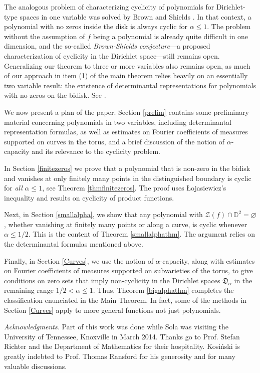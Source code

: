 \documentclass[11 pt,reqno]{amsart}
\theoremstyle{definition}
\theoremstyle{remark}
\numberwithin{equation}{section} \numberwithin{figure}{section}
\begin{document}
The analogous problem of characterizing cyclicity of polynomials for
Dirichlet-type spaces in one variable was solved by Brown and Shields
\cite{BS84}. In that context, a polynomial with no zeros inside the
disk is always cyclic for $\alpha \leq 1$. The problem without the
assumption of $f$ being a polynomial is already quite difficult in one
dimension, and the so-called \emph{Brown-Shields conjecture}---a
proposed characterization of cyclicity in the Dirichlet space---still
remains open.  Generalizing our theorem to three or more variables
also remains open, as much of our approach in item (1) of the main
theorem relies heavily on an essentially two variable result: the
existence of determinantal representations for polynomials with no
zeros on the bidisk.  See \cite{AM05, GKW, Kne09, VV, HW}.

We now present a plan of the paper. Section \ref{prelim} contains some
preliminary material concerning polynomials in two variables,
including determinantal representation formulas, as well as estimates
on Fourier coefficients of measures supported on curves in the torus,
and a brief discussion of the notion of $\alpha$-capacity and its
relevance to the cyclicity problem.

In Section \ref{finitezeros} we prove that a polynomial that is non-zero in the bidisk and
vanishes at only finitely many points in the distinguished boundary is cyclic for {\it all} $\alpha \leq 1$, see Theorem \ref{thmfinitezeros}. The
proof uses \L ojasiewicz's inequality and results on cyclicity of product functions.

Next, in Section \ref{smallalpha}, we show that any polynomial with
$\mathcal{Z}(f)\cap {{\mathbb D}}^2=\varnothing$, whether vanishing at finitely
many points or along a curve, is cyclic whenever $\alpha \leq
1/2$. This is the content of Theorem \ref{smallalphathm}.  The
argument relies on the determinantal formulas mentioned above.

Finally, in Section \ref{Curves}, we use the notion of
$\alpha$-capacity, along with estimates on Fourier coefficients of
measures supported on subvarieties of the torus, to give conditions on
zero sets that imply non-cyclicity in the Dirichlet spaces
$\mathfrak{D}_\alpha$ in the remaining range $1/2< \alpha \leq
1$. Thus, Theorem \ref{bigalphathm} completes the classification
enunciated in the Main Theorem.  In fact, some of the methods in
Section \ref{Curves} apply to more general functions not just
polynomials.

\textit{Acknowledgments.}  Part of this work was done while Sola was
visiting the University of Tennessee, Knoxville in March 2014. Thanks
go to Prof.\! Stefan Richter and the Department of Mathematics for their
hospitality. Kosi\'nski is greatly indebted to Prof.\! Thomas
Ransford for his generosity and for many valuable discussions.
\end{document}
